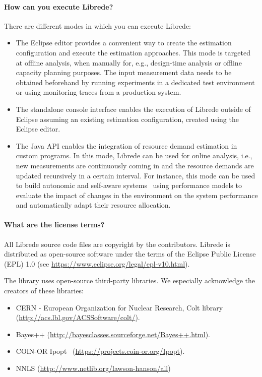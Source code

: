 \paragraph{How can you execute Librede?}
There are different modes in which you can execute Librede:
\begin{itemize}
\item The Eclipse editor provides a convenient way to create the estimation configuration and execute the estimation approaches. This mode is targeted at offline analysis, when manually for, e.g., design-time analysis or offline capacity planning purposes. The input measurement data needs to be obtained beforehand by running experiments in a dedicated test environment or using monitoring traces from a production system.
\item The standalone console interface enables the execution of Librede outside of Eclipse assuming an existing estimation configuration, created using the Eclipse editor.
\item The Java API enables the integration of resource demand estimation in custom programs. In this mode, Librede can be used for online analysis, i.e., new measurements are continuously coming in and the resource demands are updated recursively in a certain interval. For instance, this mode can be used to build autonomic and self-aware systems~\cite{KoBrHuRe2010-SCC-Towards} using performance models to evaluate the impact of changes in the environment on the system performance and automatically adapt their resource allocation.
\end{itemize}

\paragraph{What are the license terms?}

All Librede source code files are copyright by the contributors. Librede is distributed as open-source software under the terms of the Eclipse Public License (EPL) 1.0 (see \url{https://www.eclipse.org/legal/epl-v10.html}).

The library uses open-source third-party libraries. We especially acknowledge the creators of these libraries:
\begin{itemize}
\item CERN - European Organization for Nuclear Research, Colt library (\url{http://acs.lbl.gov/ACSSoftware/colt/}).
\item Bayes++ (\url{http://bayesclasses.sourceforge.net/Bayes++.html}).
\item COIN-OR Ipopt~\cite{ipopt2006} (\url{https://projects.coin-or.org/Ipopt}).
\item NNLS (\url{http://www.netlib.org/lawson-hanson/all})
\end{itemize}

